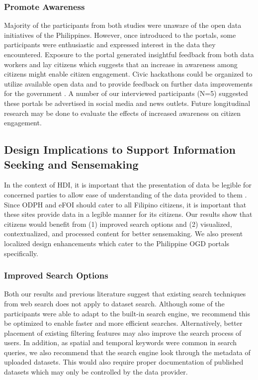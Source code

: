 \documentclass{sigchi}
\begin{document}
\subsubsection{Promote Awareness}
Majority of the participants from both studies were unaware of the open data initiatives of the Philippines. However, once introduced to the portals, some participants were enthusiastic and expressed interest in the data they encountered. Exposure to the portal generated insightful feedback from both data workers and lay citizens which suggests that an increase in awareness among citizens might enable citizen engagement. Civic hackathons could be organized to utilize available open data and to provide feedback on further data improvements for the government \cite{Robinson2016}. A number of our interviewed participants (N=5) suggested these portals be advertised in social media and news outlets. Future longitudinal research may be done to evaluate the effects of increased awareness on citizen engagement.

\subsection{Design Implications to Support Information Seeking and Sensemaking}
In the context of HDI, it is important that the presentation of data be legible for concerned parties to allow ease of understanding of the data provided to them \cite{Mortier2014}. Since ODPH and eFOI should cater to all Filipino citizens, it is important that these sites provide data in a legible manner for its citizens. Our results show that citizens would benefit from (1) improved search options and (2) visualized, contextualized, and processed content for better sensemaking. We also present localized design enhancements which cater to the Philippine OGD portals specifically.

\subsubsection{Improved Search Options}
Both our results and previous literature \cite{kacprzak2019characterising} suggest that existing search techniques from web search does not apply to dataset search. Although some of the participants were able to adapt to the built-in search engine, we recommend this be optimized to enable faster and more efficient searches. Alternatively, better placement of existing filtering features may also improve the search process of users. In addition, as spatial and temporal keywords were common in search queries, we also recommend that the search engine look through the metadata of uploaded datasets. This would also require proper documentation of published datasets which may only be controlled by the data provider.
\end{document}
